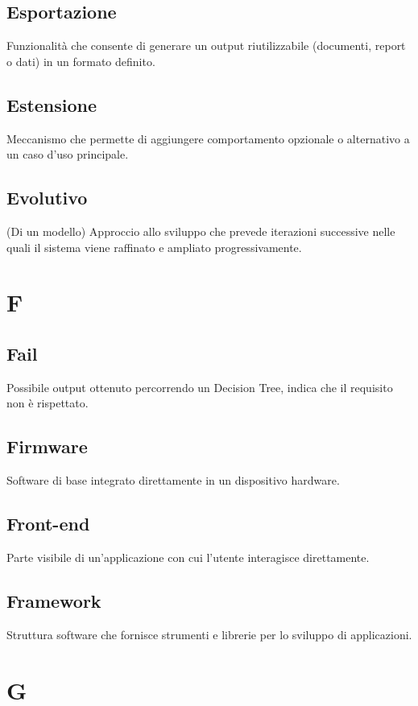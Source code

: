 \documentclass[a4paper,12pt]{article}
\begin{document}
          \subsection*{Esportazione}
			Funzionalità che consente di generare un output riutilizzabile (documenti, report o dati) in un formato definito.
          \subsection*{Estensione}
			Meccanismo che permette di aggiungere comportamento opzionale o alternativo a un caso d'uso principale.
          \subsection*{Evolutivo}
			(Di un modello) Approccio allo sviluppo che prevede iterazioni successive nelle quali il sistema viene raffinato e ampliato progressivamente.
          
          

\newpage    
        \section{F}
        
          \subsection*{Fail}
			Possibile output ottenuto percorrendo un Decision Tree, indica che il requisito non è rispettato.
          \subsection*{Firmware}
            Software di base integrato direttamente in un dispositivo hardware.
          \subsection*{Front-end}
			Parte visibile di un'applicazione con cui l'utente interagisce direttamente.
          \subsection*{Framework}
			Struttura software che fornisce strumenti e librerie per lo sviluppo di applicazioni.
        
\newpage 
      
        \section{G}
        
\end{document}
